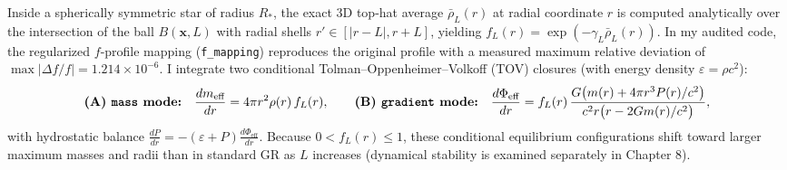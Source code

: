 \documentclass[10pt,a4paper]{article}
\begin{document}
\par
Inside a spherically symmetric star of radius $R_*$, the exact 3D top-hat average $\bar{\rho}_L(r)$ at radial coordinate $r$ is computed analytically over the intersection of the ball $B(\mathbf{x},L)$ with radial shells $r' \in [|r-L|, r+L]$, yielding $f_L(r) = \exp(-\gamma_L\bar{\rho}_L(r))$. In my audited code, the regularized $f$-profile mapping (\texttt{f\_mapping}) reproduces the original profile with a measured maximum relative deviation of \textbf{$\max|\Delta f/f| = 1.214\times 10^{-6}$}. I integrate two conditional Tolman--Oppenheimer--Volkoff (TOV) closures (with energy density $\varepsilon = \rho c^2$):
\begin{equation}
  \textbf{(A) \texttt{mass} mode:}\quad \frac{dm_{\text{eff}}}{dr} = 4\pi r^2 \rho(r)\,f_L(r), \qquad
  \textbf{(B) \texttt{gradient} mode:}\quad \frac{d\Phi_{\text{eff}}}{dr} = f_L(r)\,\frac{G\bigl(m(r) + 4\pi r^3 P(r)/c^2\bigr)}{c^2 r\bigl(r - 2Gm(r)/c^2\bigr)},
\end{equation}
with hydrostatic balance $\frac{dP}{dr} = -(\varepsilon + P)\frac{d\Phi_{\text{eff}}}{dr}$. Because $0 < f_L(r) \le 1$, these conditional equilibrium configurations shift toward larger maximum masses and radii than in standard GR as $L$ increases (dynamical stability is examined separately in Chapter 8).
\end{document}
